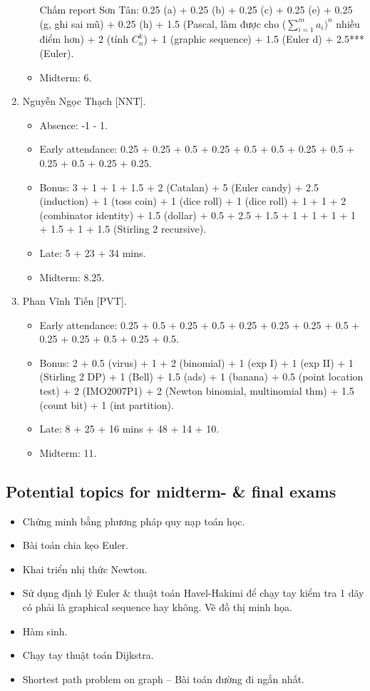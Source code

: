 \documentclass{article}
\begin{document}
\begin{enumerate}
\begin{itemize}
		Chấm report Sơn Tân: 0.25 (a) + 0.25 (b) + 0.25 (c) + 0.25 (e) + 0.25 (g, ghi sai mũ) + 0.25 (h) + 1.5 (Pascal, làm được cho ($\sum_{i=1}^m a_i)^n$ nhiều điểm hơn) + 2 (tính $C_n^k$) + 1 (graphic sequence) + 1.5 (Euler d) + 2.5*** (Euler).
        \item Midterm: 6.
	\end{itemize}
	\item {\sc Nguyễn Ngọc Thạch [NNT].}
	\begin{itemize}
        \item Absence: -1 - 1.
		\item Early attendance: 0.25 + 0.25 + 0.5 + 0.25 + 0.5 + 0.5 + 0.25 + 0.5 + 0.25 + 0.5 + 0.25 + 0.25.
		\item Bonus: 3 + 1 + 1 + 1.5 + 2 (Catalan) + 5 (Euler candy) + 2.5 (induction) + 1 (toss coin) + 1 (dice roll) + 1 (dice roll) + 1 + 1 + 2 (combinator identity) + 1.5 (dollar) + 0.5 + 2.5 + 1.5 + 1 + 1 + 1 + 1 + 1.5 + 1 + 1.5 (Stirling 2 recursive).
		\item Late: 5 + 23 + 34 mins.
        \item Midterm: 8.25.
	\end{itemize}
	\item {\sc Phan Vĩnh Tiến [PVT].}
	\begin{itemize}
		\item Early attendance: 0.25 + 0.5 + 0.25 + 0.5 + 0.25 + 0.25 + 0.25 + 0.5 + 0.25 + 0.25 + 0.5 + 0.25 + 0.5.
		\item Bonus: 2 + 0.5 (virus) + 1 + 2 (binomial) + 1 (exp I) + 1 (exp II) + 1 (Stirling 2 DP) + 1 (Bell) + 1.5 (ads) + 1 (banana) + 0.5 (point location test) + 2 (IMO2007P1) + 2 (Newton binomial, multinomial thm) + 1.5 (count bit) + 1 (int partition).
        \item Late: 8 + 25 + 16 mins + 48 + 14 + 10.
        \item Midterm: 11.
	\end{itemize}
\end{enumerate}


\subsection{Potential topics for midterm- \& final exams}

\begin{itemize}
	\item Chứng minh bằng phương pháp quy nạp toán học.
	\item Bài toán chia kẹo Euler.
	\item Khai triển nhị thức Newton.
	\item Sử dụng định lý Euler \& thuật toán Havel-Hakimi để chạy tay kiểm tra 1 dãy có phải là graphical sequence hay không. Vẽ đồ thị minh họa.
	\item Hàm sinh.
	\item Chạy tay thuật toán Dijkstra.
	\item Shortest path problem on graph -- Bài toán đường đi ngắn nhất.
\end{itemize}
\end{document}
